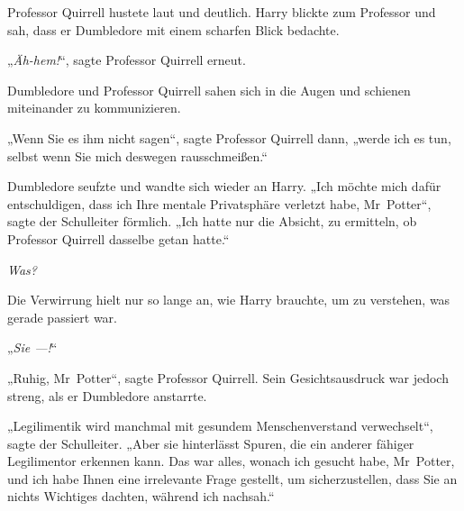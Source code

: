 Professor Quirrell hustete laut und deutlich. Harry blickte zum Professor und sah, dass er Dumbledore mit einem scharfen Blick bedachte.

„\emph{Äh-hem!}“, sagte Professor Quirrell erneut.

Dumbledore und Professor Quirrell sahen sich in die Augen und schienen miteinander zu kommunizieren.

„Wenn Sie es ihm nicht sagen“, sagte Professor Quirrell dann, „werde ich es tun, selbst wenn Sie mich deswegen rausschmeißen.“

Dumbledore seufzte und wandte sich wieder an Harry.
„Ich möchte mich dafür entschuldigen, dass ich Ihre mentale Privatsphäre verletzt habe, Mr~Potter“, sagte der Schulleiter förmlich.
„Ich hatte nur die Absicht, zu ermitteln, ob Professor Quirrell dasselbe getan hatte.“

\emph{Was?}

Die Verwirrung hielt nur so lange an, wie Harry brauchte, um zu verstehen, was gerade passiert war.

„\emph{Sie —!}“

„Ruhig, Mr~Potter“, sagte Professor Quirrell. Sein Gesichtsausdruck war jedoch streng, als er Dumbledore anstarrte.

„Legilimentik wird manchmal mit gesundem Menschenverstand verwechselt“, sagte der Schulleiter.
„Aber sie hinterlässt Spuren, die ein anderer fähiger Legilimentor erkennen kann. Das war alles, wonach ich gesucht habe, Mr~Potter, und ich habe Ihnen eine irrelevante Frage gestellt, um sicherzustellen, dass Sie an nichts Wichtiges dachten, während ich nachsah.“

